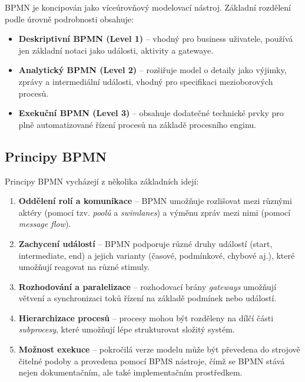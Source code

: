 BPMN je koncipován jako víceúrovňový modelovací nástroj. Základní rozdělení podle úrovně podrobnosti obsahuje:

\begin{itemize}
  \item \textbf{Deskriptivní BPMN (Level 1)} – vhodný pro business uživatele, používá jen základní notaci jako události, aktivity a gatewaye.
  \item \textbf{Analytický BPMN (Level 2)} – rozšiřuje model o detaily jako výjimky, zprávy a intermediální události, vhodný pro specifikaci mezioborových procesů.
  \item \textbf{Exekuční BPMN (Level 3)} – obsahuje dodatečné technické prvky pro plně automatizované řízení procesů na základě procesního enginu.\cite{Pergl2023BPMN}
\end{itemize}


\subsection{Principy BPMN}
\label{sec:principy-bpmn}

Principy BPMN vycházejí z několika základních idejí:

\begin{enumerate}
  \item \textbf{Oddělení rolí a komunikace} – BPMN umožňuje rozlišovat mezi různými aktéry (pomocí tzv. \emph{poolů} a \emph{swimlanes}) a výměnu zpráv mezi nimi (pomocí \emph{message flow}).
  \item \textbf{Zachycení událostí} – BPMN podporuje různé druhy událostí (start, intermediate, end) a jejich varianty (časové, podmínkové, chybové aj.), které umožňují reagovat na různé stimuly.
  \item \textbf{Rozhodování a paralelizace} – rozhodovací brány \emph{gateways} umožňují větvení a synchronizaci toků řízení na základě podmínek nebo událostí.
  \item \textbf{Hierarchizace procesů} – procesy mohou být rozděleny na dílčí části \emph{subprocesy}, které umožňují lépe strukturovat složitý systém.
  \item \textbf{Možnost exekuce} – pokročilá verze modelu může být převedena do strojově čitelné podoby a provedena pomocí BPMS nástroje, čímž se BPMN stává nejen dokumentačním, ale také implementačním prostředkem. \cite{Pergl2023BPMN,Pergl2019BPMN2}
\end{enumerate}

